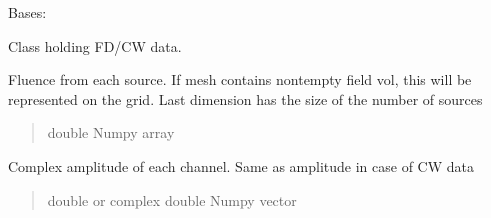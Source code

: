 \documentclass[letterpaper,10pt,english]{sphinxmanual}
\begin{document}
\begin{fulllineitems}
\label{\detokenize{_autosummary/nirfasterff.base.data.FDdata:nirfasterff.base.data.FDdata}}
\pysigstartsignatures
\pysigline
{}
\pysigstopsignatures
\sphinxAtStartPar
Bases: 

\sphinxAtStartPar
Class holding FD/CW data.

\begin{fulllineitems}
\label{\detokenize{_autosummary/nirfasterff.base.data.FDdata:nirfasterff.base.data.FDdata.phi}}
\pysigstartsignatures
\pysigline
{}
\pysigstopsignatures
\sphinxAtStartPar
Fluence from each source. If mesh contains non\sphinxhyphen{}tempty field vol, this will be represented on the grid. Last dimension has the size of the number of sources
\begin{quote}\begin{description}
\sphinxAtStartPar
double Numpy array

\end{description}\end{quote}

\end{fulllineitems}


\begin{fulllineitems}
\label{\detokenize{_autosummary/nirfasterff.base.data.FDdata:nirfasterff.base.data.FDdata.complex}}
\pysigstartsignatures
\pysigline
{}
\pysigstopsignatures
\sphinxAtStartPar
Complex amplitude of each channel. Same as amplitude in case of CW data
\begin{quote}\begin{description}
\sphinxAtStartPar
double or complex double Numpy vector

\end{description}\end{quote}

\end{fulllineitems}


\end{fulllineitems}
\end{document}
